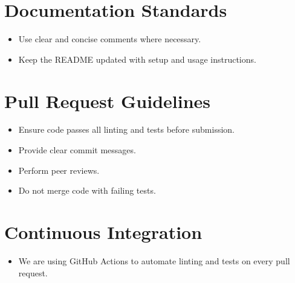 \documentclass[a4paper,12pt]{article}
\begin{document}
\section{Documentation Standards}
\begin{itemize}
\item Use clear and concise comments where necessary.
\item Keep the README updated with setup and usage instructions.
\end{itemize}

\section{Pull Request Guidelines}
\begin{itemize}
\item Ensure code passes all linting and tests before submission.
\item Provide clear commit messages.
\item Perform peer reviews.
\item Do not merge code with failing tests.
\end{itemize}

\section{Continuous Integration}
\begin{itemize}
\item We are using GitHub Actions to automate linting and tests on every pull request.
\end{itemize}
\end{document}
